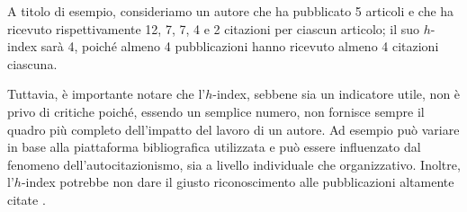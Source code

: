 A titolo di esempio, consideriamo un autore che ha pubblicato 5 articoli e che ha ricevuto rispettivamente 12, 7, 7, 4 e 2 citazioni per ciascun articolo; il suo $h$-index sarà 4, poiché almeno 4 pubblicazioni hanno ricevuto almeno 4 citazioni ciascuna.

Tuttavia, è importante notare che l'$h$-index, sebbene sia un indicatore utile, non è privo di critiche poiché, essendo un semplice numero, non fornisce sempre il quadro più completo dell'impatto del lavoro di un autore. Ad esempio può variare in base alla piattaforma bibliografica utilizzata e può essere influenzato dal fenomeno dell'autocitazionismo, sia a livello individuale che organizzativo. Inoltre, l'$h$-index potrebbe non dare il giusto riconoscimento alle pubblicazioni altamente citate \cite{h-index-problems, h-index-problems-2}.
